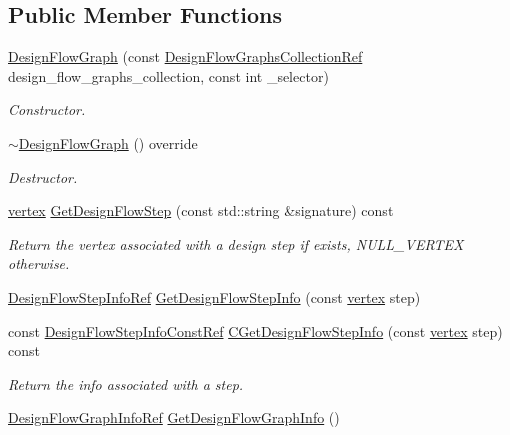 \subsection*{Public Member Functions}
\begin{DoxyCompactItemize}
\item 
\hyperlink{classDesignFlowGraph_aa3ce6a9558465018fbdd33a5164677fe}{Design\+Flow\+Graph} (const \hyperlink{design__flow__graph_8hpp_abb8645fa685dc5bd944be20162a6d174}{Design\+Flow\+Graphs\+Collection\+Ref} design\+\_\+flow\+\_\+graphs\+\_\+collection, const int \+\_\+selector)
\begin{DoxyCompactList}\small\item\em Constructor. \end{DoxyCompactList}\item 
\hyperlink{classDesignFlowGraph_a1e2ca220f342258249f328f0d59417c6}{$\sim$\+Design\+Flow\+Graph} () override
\begin{DoxyCompactList}\small\item\em Destructor. \end{DoxyCompactList}\item 
\hyperlink{graph_8hpp_abefdcf0544e601805af44eca032cca14}{vertex} \hyperlink{classDesignFlowGraph_aba5af617d4377a9aab3dba14d2d5bf62}{Get\+Design\+Flow\+Step} (const std\+::string \&signature) const
\begin{DoxyCompactList}\small\item\em Return the vertex associated with a design step if exists, N\+U\+L\+L\+\_\+\+V\+E\+R\+T\+EX otherwise. \end{DoxyCompactList}\item 
\hyperlink{design__flow__graph_8hpp_a6c29654e11949ccdea9e43f8ec64e7a9}{Design\+Flow\+Step\+Info\+Ref} \hyperlink{classDesignFlowGraph_adb71a3b457e5865e877470562c3d2165}{Get\+Design\+Flow\+Step\+Info} (const \hyperlink{graph_8hpp_abefdcf0544e601805af44eca032cca14}{vertex} step)
\item 
const \hyperlink{design__flow__graph_8hpp_af21bbb295aec129537b90f4702020ee2}{Design\+Flow\+Step\+Info\+Const\+Ref} \hyperlink{classDesignFlowGraph_a04cf3b9917f596b49d6bc3aae722c896}{C\+Get\+Design\+Flow\+Step\+Info} (const \hyperlink{graph_8hpp_abefdcf0544e601805af44eca032cca14}{vertex} step) const
\begin{DoxyCompactList}\small\item\em Return the info associated with a step. \end{DoxyCompactList}\item 
\hyperlink{design__flow__graph_8hpp_aacc9497886d3ea02b43b537e6fceca72}{Design\+Flow\+Graph\+Info\+Ref} \hyperlink{classDesignFlowGraph_a4f6d9efa952efe1ddde16382a7454a21}{Get\+Design\+Flow\+Graph\+Info} ()

\end{DoxyCompactItemize}
